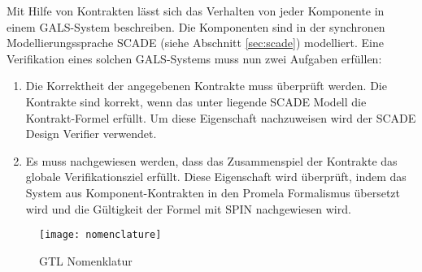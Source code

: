 Mit Hilfe von Kontrakten lässt sich das Verhalten von jeder Komponente in einem GALS-System beschreiben.
Die Komponenten sind in der synchronen Modellierungssprache SCADE (siehe Abschnitt \ref{sec:scade}) modelliert.
Eine Verifikation eines solchen GALS-Systems muss nun zwei Aufgaben erfüllen:
\begin{enumerate}
\item Die Korrektheit der angegebenen Kontrakte muss überprüft werden.
  Die Kontrakte sind korrekt, wenn das unter liegende SCADE Modell die Kontrakt-Formel erfüllt.
  Um diese Eigenschaft nachzuweisen wird der SCADE Design Verifier verwendet.
\item Es muss nachgewiesen werden, dass das Zusammenspiel der Kontrakte das globale Verifikationsziel erfüllt.
  Diese Eigenschaft wird überprüft, indem das System aus Komponent-Kontrakten in den Promela Formalismus übersetzt wird und die Gültigkeit der Formel mit SPIN nachgewiesen wird.
\end{enumerate}
\begin{figure}[h]
  \centering
  \texttt{[image: nomenclature]}
  \caption{GTL Nomenklatur}
  \label{fig:nomenclature}
\end{figure}
